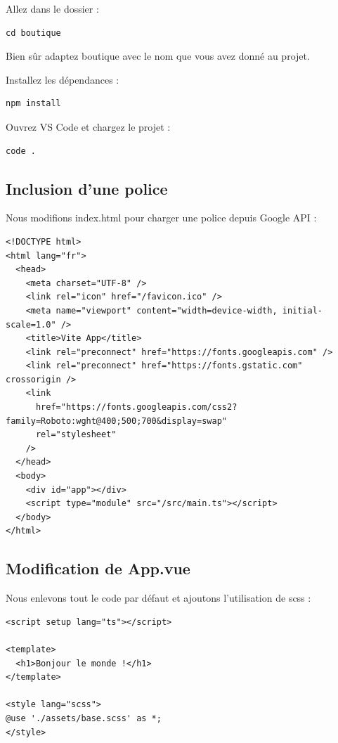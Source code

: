 \documentclass{article}
\begin{document}
Allez dans le dossier :
\begin{verbatim}
cd boutique
\end{verbatim}
Bien sûr adaptez {\color{monOrange}boutique} avec le nom que vous avez donné au projet.

Installez les dépendances :
\begin{verbatim}
npm install
\end{verbatim}
Ouvrez {\color{monOrange}VS Code} et chargez le projet :
\begin{verbatim}
code .
\end{verbatim}

\subsection{Inclusion d'une police}
Nous modifions {\color{monOrange}index.html} pour charger une police depuis {\color{monOrange}Google API} :
\begin{verbatim}
<!DOCTYPE html>
<html lang="fr">
  <head>
    <meta charset="UTF-8" />
    <link rel="icon" href="/favicon.ico" />
    <meta name="viewport" content="width=device-width, initial-scale=1.0" />
    <title>Vite App</title>
    <link rel="preconnect" href="https://fonts.googleapis.com" />
    <link rel="preconnect" href="https://fonts.gstatic.com" crossorigin />
    <link
      href="https://fonts.googleapis.com/css2?family=Roboto:wght@400;500;700&display=swap"
      rel="stylesheet"
    />
  </head>
  <body>
    <div id="app"></div>
    <script type="module" src="/src/main.ts"></script>
  </body>
</html>
\end{verbatim}

\subsection{Modification de {\color{monOrange}App.vue}}
Nous enlevons tout le code par défaut et ajoutons l'utilisation de {\color{monOrange}scss} :
\begin{verbatim}
<script setup lang="ts"></script>

<template>
  <h1>Bonjour le monde !</h1>
</template>

<style lang="scss">
@use './assets/base.scss' as *;
</style>
\end{verbatim}
\end{document}
